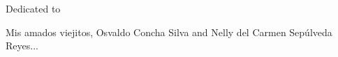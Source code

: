 \documentclass[draft]{book}
\begin{document}
\begin{dedication}

Dedicated to

Mis amados viejitos, Osvaldo Concha Silva and Nelly del Carmen Sep\'ulveda Reyes...
\end{dedication}

\tableofcontents

\listoffigures
{}

\listoftables
{}

% 








\listoftodos

%
%




\printindex
\end{document}
